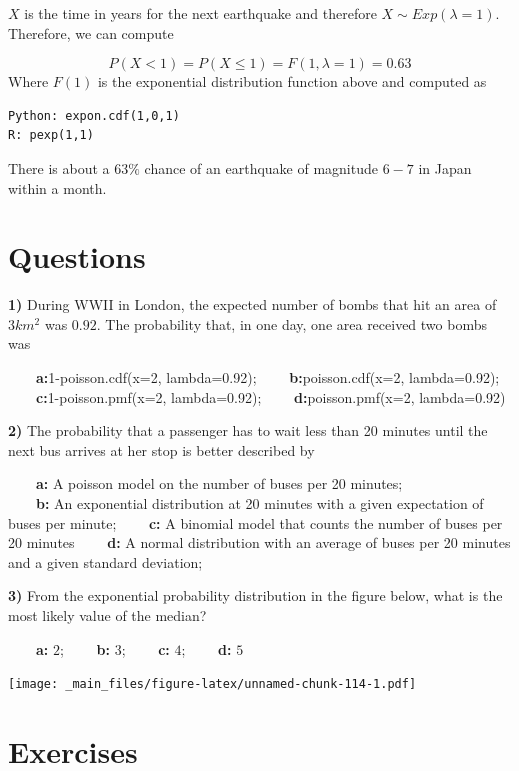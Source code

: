 \documentclass[
]{book}
\begin{document}
\(X\) is the time in years for the next earthquake and therefore \(X \sim Exp(\lambda=1)\). Therefore, we can compute

\[P(X < 1)= P(X \le 1) = F(1,\lambda=1)=0.63\]
Where \(F(1)\) is the exponential distribution function above and computed as

\begin{verbatim}
Python: expon.cdf(1,0,1)
R: pexp(1,1)
\end{verbatim}

There is about a \(63\%\) chance of an earthquake of magnitude \(6-7\) in Japan within a month.

\hypertarget{questions-5}{%
\section{Questions}\label{questions-5}}

\textbf{1)} During WWII in London, the expected number of bombs that hit an area of \(3km^2\) was \(0.92\). The probability that, in one day, one area received two bombs was

\textbf{\(\qquad\)a:}1-poisson.cdf(x=2, lambda=0.92);
\textbf{\(\qquad\)b:}poisson.cdf(x=2, lambda=0.92); \textbf{\(\qquad\)c:}1-poisson.pmf(x=2, lambda=0.92); \textbf{\(\qquad\)d:}poisson.pmf(x=2, lambda=0.92)

\textbf{2)} The probability that a passenger has to wait less than 20 minutes until the next bus arrives at her stop is better described by

\textbf{\(\qquad\)a:} A poisson model on the number of buses per 20 minutes;\\
\textbf{\(\qquad\)b:} An exponential distribution at 20 minutes with a given expectation of buses per minute;
\textbf{\(\qquad\)c:} A binomial model that counts the number of buses per 20 minutes
\textbf{\(\qquad\)d:} A normal distribution with an average of buses per 20 minutes and a given standard deviation;

\textbf{3)} From the exponential probability distribution in the figure below, what is the most likely value of the median?

\textbf{\(\qquad\)a:} \(2\); \textbf{\(\qquad\)b:} \(3\); \textbf{\(\qquad\)c:} \(4\); \textbf{\(\qquad\)d:} \(5\)

\texttt{[image: \_main\_files/figure-latex/unnamed-chunk-114-1.pdf]}

\hypertarget{exercises-6}{%
\section{Exercises}\label{exercises-6}}
\end{document}
